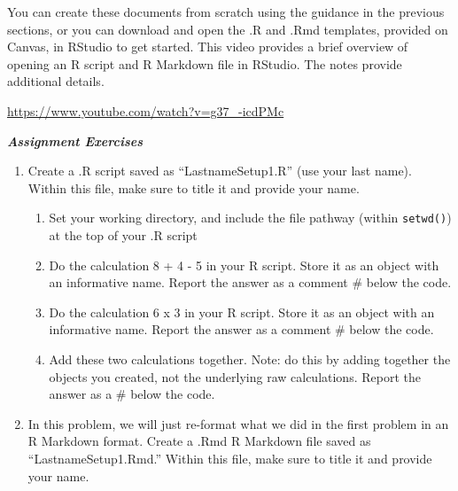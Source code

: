 \documentclass[
  letterpaper,
  DIV=11,
  numbers=noendperiod]{scrreprt}
\providecommand{\tightlist}{%
  \setlength{\itemsep}{0pt}\setlength{\parskip}{0pt}}\usepackage{longtable,booktabs,array}
\begin{document}
You can create these documents from scratch using the guidance in the
previous sections, or you can download and open the .R and .Rmd
templates, provided on Canvas, in RStudio to get started. This video
provides a brief overview of opening an R script and R Markdown file in
RStudio. The notes provide additional details.

\url{https://www.youtube.com/watch?v=g37_-icdPMc}

\textbf{\emph{Assignment Exercises}}

\begin{enumerate}
\def\labelenumi{\arabic{enumi}.}
\tightlist
\item
  Create a .R script saved as ``LastnameSetup1.R'' (use your last name).
  Within this file, make sure to title it and provide your name.

  \begin{enumerate}
  \def\labelenumii{\arabic{enumii}.}
  \tightlist
  \item
    Set your working directory, and include the file pathway (within
    \texttt{setwd()}) at the top of your .R script
  \item
    Do the calculation 8 + 4 - 5 in your R script. Store it as an object
    with an informative name. Report the answer as a comment \# below
    the code.
  \item
    Do the calculation 6 x 3 in your R script. Store it as an object
    with an informative name. Report the answer as a comment \# below
    the code.
  \item
    Add these two calculations together. Note: do this by adding
    together the objects you created, not the underlying raw
    calculations. Report the answer as a \# below the code.
  \end{enumerate}
\item
  In this problem, we will just re-format what we did in the first
  problem in an R Markdown format. Create a .Rmd R Markdown file saved
  as ``LastnameSetup1.Rmd.'' Within this file, make sure to title it and
  provide your name.


\end{enumerate}
\end{document}
